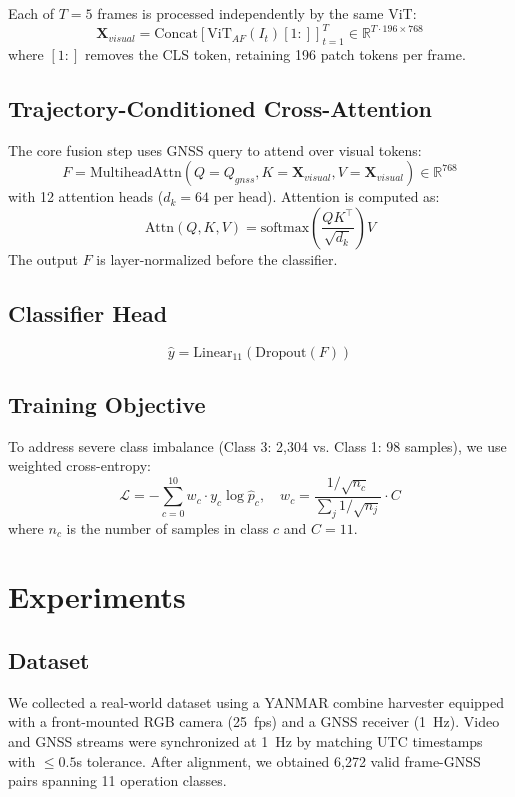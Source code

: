 \documentclass[10pt,twocolumn]{article}
\begin{document}
Each of $T=5$ frames is processed independently by the same ViT:
\[
\mathbf{X}_{visual} = \text{Concat}\left[\text{ViT}_{AF}(I_t)[1:]\right]_{t=1}^{T} \in \mathbb{R}^{T \cdot 196 \times 768}
\]
where $[1:]$ removes the CLS token, retaining 196 patch tokens per frame.

\subsection{Trajectory-Conditioned Cross-Attention}
The core fusion step uses GNSS query to attend over visual tokens:
\[
F = \text{MultiheadAttn}(Q=Q_{gnss}, K=\mathbf{X}_{visual}, V=\mathbf{X}_{visual}) \in \mathbb{R}^{768}
\]
with 12 attention heads ($d_k = 64$ per head). Attention is computed as:
\[
\text{Attn}(Q,K,V) = \text{softmax}\!\left(\frac{QK^\top}{\sqrt{d_k}}\right)V
\]
The output $F$ is layer-normalized before the classifier.

\subsection{Classifier Head}
\[
\hat{y} = \text{Linear}_{11}(\text{Dropout}(F))
\]

\subsection{Training Objective}
To address severe class imbalance (Class 3: 2,304 vs. Class 1: 98 samples), we use weighted cross-entropy:
\[
\mathcal{L} = -\sum_{c=0}^{10} w_c \cdot y_c \log \hat{p}_c, \quad w_c = \frac{1/\sqrt{n_c}}{\sum_{j} 1/\sqrt{n_j}} \cdot C
\]
where $n_c$ is the number of samples in class $c$ and $C=11$.

\section{Experiments}

\subsection{Dataset}
We collected a real-world dataset using a YANMAR combine harvester equipped with a front-mounted RGB camera (25~fps) and a GNSS receiver (1~Hz). Video and GNSS streams were synchronized at 1~Hz by matching UTC timestamps with $\leq 0.5$s tolerance. After alignment, we obtained 6,272 valid frame-GNSS pairs spanning 11 operation classes.
\end{document}
